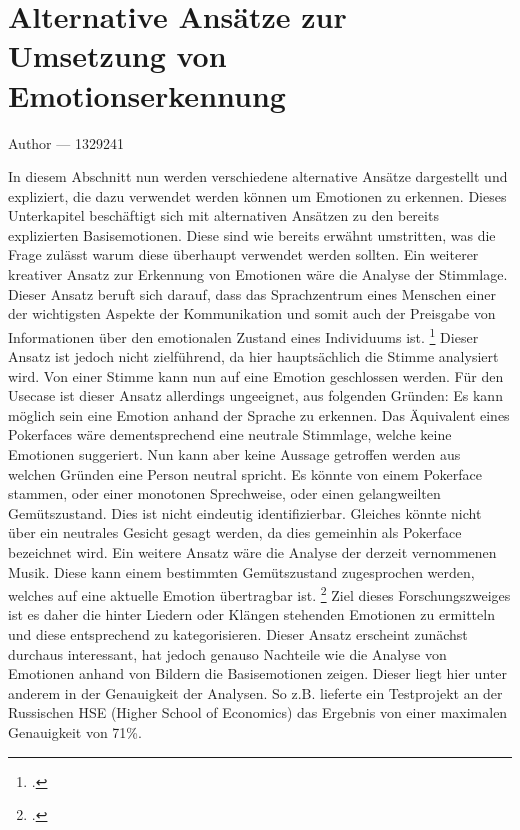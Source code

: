\documentclass[12pt, a4paper]{report}
\makeatletter
\newcommand{\sectionauthor}[1]{%
  {\parindent0pt\vspace*{-5pt}%
  \large{Author --- }
  \linespread{1.1}\large\scshape#1%
  \par\nobreak\vspace*{35pt} }
  \@afterheading%
}
\makeatother
\begin{document}
\section{Alternative Ansätze zur Umsetzung von Emotionserkennung}
\sectionauthor{1329241}
In diesem Abschnitt nun werden verschiedene alternative Ansätze dargestellt und expliziert, die dazu verwendet werden können um Emotionen zu erkennen.
Dieses Unterkapitel beschäftigt sich mit alternativen Ansätzen zu den bereits explizierten Basisemotionen. Diese sind wie bereits erwähnt umstritten, was die Frage zulässt warum diese überhaupt verwendet werden sollten. Ein weiterer kreativer Ansatz zur Erkennung von Emotionen wäre die Analyse der Stimmlage.
Dieser Ansatz beruft sich darauf, dass das Sprachzentrum eines Menschen einer der wichtigsten Aspekte der Kommunikation und somit auch der Preisgabe von Informationen über den emotionalen Zustand eines Individuums ist.
\footcite[Vgl. ][Abstract]{EmotionInSpeech}
Dieser Ansatz ist jedoch nicht zielführend, da hier hauptsächlich die Stimme analysiert wird. Von einer Stimme kann nun auf eine Emotion geschlossen werden. Für den Usecase ist dieser Ansatz allerdings ungeeignet, aus folgenden Gründen:\newline
Es kann möglich sein eine Emotion anhand der Sprache zu erkennen. Das Äquivalent eines Pokerfaces wäre dementsprechend eine neutrale Stimmlage, welche keine Emotionen suggeriert. Nun kann aber keine Aussage getroffen werden aus welchen Gründen eine Person neutral spricht. Es könnte von einem Pokerface stammen, oder einer monotonen Sprechweise, oder einen gelangweilten Gemütszustand. Dies ist nicht eindeutig identifizierbar. Gleiches könnte nicht über ein neutrales Gesicht gesagt werden, da dies gemeinhin als Pokerface bezeichnet wird. %
Ein weitere Ansatz wäre die Analyse der derzeit vernommenen Musik. Diese kann einem bestimmten Gemütszustand zugesprochen werden, welches auf eine aktuelle Emotion übertragbar ist.
\footcite[Vgl.][1]{MusicEmotion}
Ziel dieses Forschungszweiges ist es daher die hinter Liedern oder Klängen stehenden Emotionen zu ermitteln und diese entsprechend zu kategorisieren.
Dieser Ansatz erscheint zunächst durchaus interessant, hat jedoch genauso Nachteile wie die Analyse von Emotionen anhand von Bildern die Basisemotionen zeigen. %
Dieser liegt hier unter anderem in der Genauigkeit der Analysen. So z.B. lieferte ein Testprojekt an der Russischen HSE (Higher School of Economics) das Ergebnis von einer maximalen Genauigkeit von 71\%.
\end{document}

